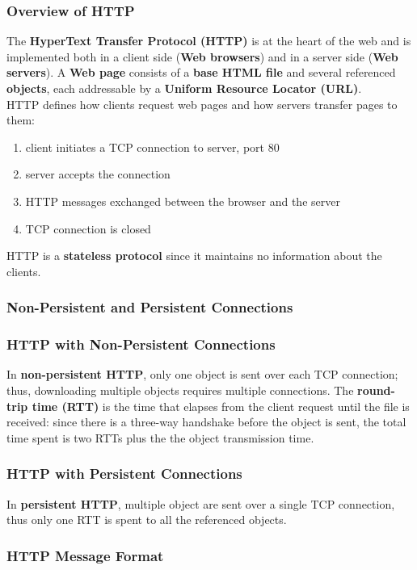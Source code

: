 \documentclass{article}
\begin{document}
\subsubsection{Overview of HTTP}
The \textbf{HyperText Transfer Protocol (HTTP)} is at the heart of the web and is implemented both in a client side (\textbf{Web browsers}) and in a server side (\textbf{Web servers}). A \textbf{Web page} consists of a \textbf{base HTML file} and several referenced \textbf{objects}, each addressable by a \textbf{Uniform Resource Locator (URL)}. \\
HTTP defines how clients request web pages and how servers transfer pages to them:
\begin{enumerate}
    \item client initiates a TCP connection to server, port $ 80 $
    \item server accepts the connection 
    \item HTTP messages exchanged between the browser and the server
    \item TCP connection is closed
\end{enumerate}
HTTP is a \textbf{stateless protocol} since it maintains no information about the clients.
\subsubsection{Non-Persistent and Persistent Connections}
\subsubsection*{HTTP with Non-Persistent Connections}
In \textbf{non-persistent HTTP}, only one object is sent over each TCP connection; thus, downloading multiple objects requires multiple connections.
The \textbf{round-trip time (RTT)} is the time that elapses from the client request until the file is received: since there is a three-way handshake before the object is sent, the total time spent is two RTTs plus the the object transmission time.
\subsubsection*{HTTP with Persistent Connections}
In \textbf{persistent HTTP}, multiple object are sent over a single TCP connection, thus only one RTT is spent to all the referenced objects.
\subsubsection{HTTP Message Format}
\end{document}
